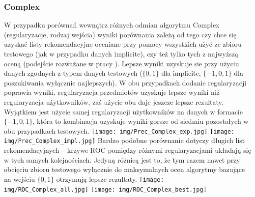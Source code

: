 \documentclass{pracamgr}
\begin{document}
    \subsubsection{Complex}
     W przypadku porównań wewnątrz różnych odmian algorytmu Complex (regularyzacje, rodzaj wejścia)
     wyniki porównania zależą od tego czy chce się uzyskać listy rekomendacyjne oceniane przy pomocy wszystkich
     użyć ze zbioru testowego (jak w przypadku danych implicite), czy też tylko tych z najwyższą oceną (podejście rozważane w pracy \cite{205}).
     Lepsze wyniki uzyskuje sie przy użyciu danych zgodnych z typem danych testowych ($\{0,1\}$ dla implicite,
     $\{-1,0,1\}$ dla poszukiwania wyłącznie najlepszych). W obu przypadkach dodanie regularyzacji poprawia wyniki,
     regularyzacja przedmiotów uzyskuje lepsze wyniki niż regularyzacja użytkowników, zaś użycie obu daje jeszcze lepsze rezultaty.
     Wyjątkiem jest użycie samej regularyzacji użytkowników na danych w formacie $\{-1,0,1\}$,
     która to kombinacja uzyskuje wyniki gorsze od siedmiu pozostałych w obu przypadkach testowych.\newline
     \texttt{[image: img/Prec\_Complex\_exp.jpg]}\newline
     \texttt{[image: img/Prec\_Complex\_impl.jpg]}\newline
     Bardzo podobne porównanie dotyczy długich list rekomendacyjnych -- krzywe ROC pomiędzy różnymi regularyzacjami układają się w tych samych kolejnościach.
     Jedyną różnicą jest to, że tym razem nawet przy obcięciu zbioru testowego wyłącznie do maksymalnych ocen algorytmy bazujące na wejściu $\{0,1\}$ otrzymują
     lepsze rezultaty.\newline
     \texttt{[image: img/ROC\_Complex\_all.jpg]}
     \texttt{[image: img/ROC\_Complex\_best.jpg]}\newline
\end{document}
